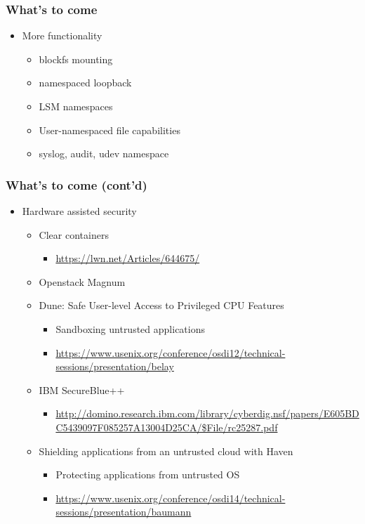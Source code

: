 \documentclass{beamer}
\begin{document}
\begin{frame}
\frametitle{What's to come}
\begin{itemize}
\item More functionality
  \begin{itemize}
  \item blockfs mounting
  \item namespaced loopback
  \item LSM namespaces
  \item User-namespaced file capabilities
  \item syslog, audit, udev namespace
  \end{itemize}
\end{itemize}
\end{frame}

\begin{frame}
\frametitle{What's to come (cont'd)}
\begin{itemize}
\item Hardware assisted security
  \begin{itemize}
  \item Clear containers
    \begin{itemize}
    \item {\tiny \url{https://lwn.net/Articles/644675/}}
    \end{itemize}
  \item Openstack Magnum
  \item Dune: Safe User-level Access to Privileged CPU Features \\
    \begin{itemize}
    \item Sandboxing untrusted applications
    \item {\tiny \url{https://www.usenix.org/conference/osdi12/technical-sessions/presentation/belay}}
    \end{itemize}
  \item IBM SecureBlue++
    \begin{itemize}
    \item {\tiny \url{http://domino.research.ibm.com/library/cyberdig.nsf/papers/E605BDC5439097F085257A13004D25CA/$File/rc25287.pdf}}
    \end{itemize}

  \item Shielding applications from an untrusted cloud with Haven \\
    \begin{itemize}
    \item Protecting applications from untrusted OS
    \item {\tiny \url{https://www.usenix.org/conference/osdi14/technical-sessions/presentation/baumann}}
    \end{itemize}
  \end{itemize}
\end{itemize}

\end{frame}



\end{document}
